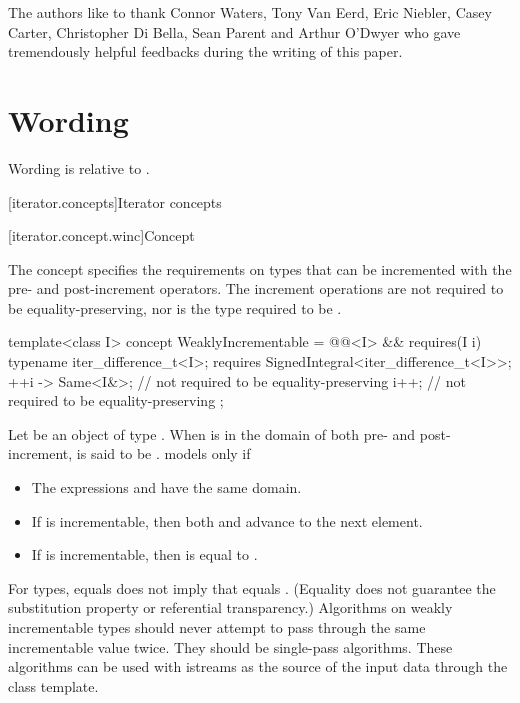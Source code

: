\documentclass{wg21}
\begin{document}
The authors like to thank Connor Waters, Tony Van Eerd, Eric Niebler,
Casey Carter, Christopher Di Bella, Sean Parent and Arthur O'Dwyer who
gave tremendously helpful feedbacks during the writing of this paper.


\section{Wording}

Wording is relative to \cite{N4820}.

[iterator.concepts]{Iterator concepts}


[iterator.concept.winc]{Concept }

\pnum
The  concept specifies the requirements on
types that can be incremented with the pre- and post-increment operators.
The increment operations are not required to be equality-preserving,
nor is the type required to be .

%
\begin{codeblock}
	template<class I>
	concept WeaklyIncrementable =
	@@<I> &&
	requires(I i) {
		typename iter_difference_t<I>;
		requires SignedIntegral<iter_difference_t<I>>;
		{ ++i } -> Same<I&>; // not required to be equality-preserving
		i++; // not required to be equality-preserving
	};
\end{codeblock}

\pnum
Let  be an object of type . When  is in the domain of
both pre- and post-increment,  is said to be .
 models  only if

\begin{itemize}
	\item The expressions  and  have the same domain.
	\item If  is incrementable, then both 
	and  advance  to the next element.
	\item If  is incrementable, then
	 is equal to
	.
\end{itemize}

\pnum
\begin{note}
	For  types,  equals  does not imply that 
	equals . (Equality does not guarantee the substitution property or referential
	transparency.) Algorithms on weakly incrementable types should never attempt to pass
	through the same incrementable value twice. They should be single-pass algorithms. These algorithms
	can be used with istreams as the source of the input data through the  class
	template.
\end{note}
\end{document}
